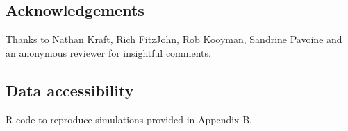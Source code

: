 \subsection*{Acknowledgements}

Thanks to Nathan Kraft, Rich FitzJohn, Rob Kooyman, Sandrine Pavoine and an anonymous reviewer for insightful comments.  

\subsection*{Data accessibility}

R code to reproduce simulations provided in Appendix B.

\nocite{zanne2014, FitzJohn2012, Revell2012}
%
%


